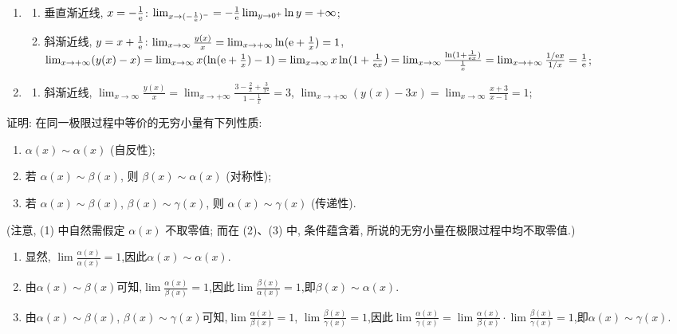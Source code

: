 \begin{solution}
    \begin{enumerate}[(1)]
        \item
              \begin{enumerate}
                  \item 垂直渐近线, $x=- \frac{1}{\mathrm{e}}$: $\lim_{x \to (-\frac{1}{\mathrm{e}})^-} = -\frac{1}{\mathrm{e}} \lim_{y \to 0^+} \ln y = +\infty$;
                  \item 斜渐近线, $y=x + \frac{1}{\mathrm{e}}$: $\lim_{x \to \infty} \frac{y(x)}{x} = \lim_{x \to + \infty} \ln(\mathrm{e} + \frac{1}{x}) = 1$, $\lim_{x \to + \infty} (y(x) - x) = \lim_{x \to \infty} x(\ln(\mathrm{e} + \frac{1}{x}) - 1) = \lim_{x \to \infty} x\ln(1 + \frac{1}{\mathrm{e} x}) = \lim_{x \to \infty} \frac{\ln(1 + \frac{1}{\mathrm{e} x})}{\frac{1}{x}} = \lim_{x \to + \infty} \frac{1 / \mathrm{e} x}{1 / x} = \frac{1}{\mathrm{e}}$;
              \end{enumerate}
        \item
              \begin{enumerate}
                  \item 斜渐近线, $\lim_{x \to \infty} \frac{y(x)}{x} = \lim_{x \to + \infty} \frac{3 - \frac{2}{x} + \frac{3}{x^2}}{1 - \frac{1}{x}} = 3$, $\lim_{x \to + \infty} (y(x) - 3x) = \lim_{x \to \infty} \frac{x+3}{x-1} = 1$;
              \end{enumerate}
    \end{enumerate}
\end{solution}

\begin{exercise}[1.3.15]
    证明: 在同一极限过程中等价的无穷小量有下列性质:
    \begin{enumerate}
        \item $\alpha(x) \sim \alpha(x)$ (自反性);
        \item 若 $\alpha(x) \sim \beta(x)$, 则 $\beta(x) \sim \alpha(x)$ (对称性);
        \item 若 $\alpha(x) \sim \beta(x)$, $\beta(x) \sim \gamma(x)$, 则 $\alpha(x) \sim \gamma(x)$ (传递性).
    \end{enumerate}
    (注意, (1) 中自然需假定 $\alpha(x)$ 不取零值; 而在 (2)、(3) 中, 条件蕴含着, 所说的无穷小量在极限过程中均不取零值.)
\end{exercise}

\begin{solution}
    \begin{enumerate}[(1)]
        \item 显然, $\lim \frac{\alpha(x)}{\alpha(x)} = 1$,因此$\alpha(x) \sim \alpha(x)$.
        \item 由$\alpha(x) \sim \beta(x)$可知,$\lim \frac{\alpha(x)}{\beta(x)} = 1$,因此$\lim \frac{\beta(x)}{\alpha(x)} = 1$,即$\beta(x) \sim \alpha(x)$.
        \item 由$\alpha(x) \sim \beta(x)$, $\beta(x) \sim \gamma(x)$可知,$\lim \frac{\alpha(x)}{\beta(x)} = 1$, $\lim \frac{\beta(x)}{\gamma(x)} = 1$,因此$\lim \frac{\alpha(x)}{\gamma(x)} = \lim \frac{\alpha(x)}{\beta(x)} \cdot \lim \frac{\beta(x)}{\gamma(x)} = 1$,即$\alpha(x) \sim \gamma(x)$.
    \end{enumerate}
\end{solution}

